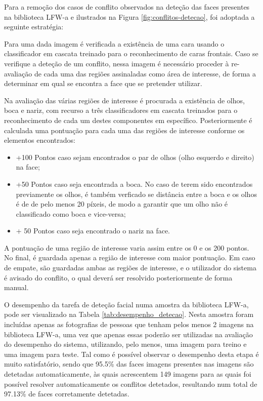 Para a remoção dos casos de conflito observados na deteção das faces presentes na biblioteca LFW-a e ilustrados na Figura \ref{fig:conflitos-detecao}, foi adoptada a seguinte estratégia:

Para uma dada imagem é verificada a existência de uma cara usando o classificador em cascata treinado para o reconhecimento de caras frontais. Caso se verifique a deteção de um conflito, nessa imagem é necessário proceder à re-avaliação de cada uma das regiões assinaladas como área de interesse, de forma a determinar em qual se encontra a face que se pretender utilizar.

Na avaliação das várias regiões de interesse é procurada a existência de olhos, boca e nariz, com recurso a três classificadores em cascata treinados para o reconhecimento de cada um destes componentes em específico. Posteriormente é calculada uma pontuação para cada uma das regiões de interesse conforme os elementos encontrados:
\begin{itemize}
\item +100 Pontos caso sejam encontrados o par de olhos (olho esquerdo e direito) na face;
\item +50 Pontos caso seja encontrada a boca. No caso de terem sido encontrados previamente os olhos, é também verficado se distância entre a boca e os olhos é de de pelo menos 20 píxeis, de modo a garantir que um olho não é classificado como boca e vice-versa;
\item + 50 Pontos caso seja encontrado o nariz na face.
\end{itemize}
A pontuação de uma região de interesse varia assim entre os 0 e os 200 pontos. No final, é guardada apenas a região de interesse com maior pontuação. Em caso de empate, são guardadas ambas as regiões de interesse, e o utilizador do sistema é avisado do conflito, o qual deverá ser resolvido posteriormente de forma manual.

O desempenho da tarefa de deteção facial numa amostra da biblioteca LFW-a, pode ser visualizado na Tabela \ref{tab:desempenho_detecao}. Nesta amostra foram incluídas apenas as fotografias de pessoas que tenham pelos menos 2 imagens na biblioteca LFW-a, uma vez que apenas essas poderão ser utilizadas na avaliação do desempenho do sistema, utilizando, pelo menos, uma imagem para treino e uma imagem para teste. Tal como é possível observar o desempenho desta etapa é muito satisfatório, sendo que 95.5\% das faces imagens presentes nas imagens são detetadas automaticamente, às quais acrescentem 149 imagens para as quais foi possível resolver automaticamente os conflitos detetados, resultando num total de 97.13\% de faces corretamente detetadas.


